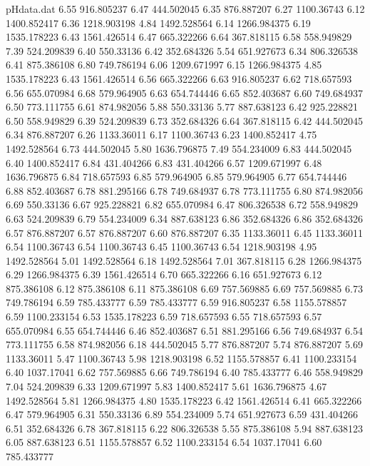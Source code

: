\begin{filecontents}{pHdata.dat}
6.55 	916.805237
6.47 	444.502045
6.35 	876.887207
6.27 	1100.36743
6.12 	1400.852417
6.36 	1218.903198
4.84 	1492.528564
6.14 	1266.984375
6.19 	1535.178223
6.43 	1561.426514
6.47 	665.322266
6.64 	367.818115
6.58 	558.949829
7.39 	524.209839
6.40 	550.33136
6.42 	352.684326
5.54 	651.927673
6.34 	806.326538
6.41 	875.386108
6.80 	749.786194
6.06 	1209.671997
6.15 	1266.984375
4.85 	1535.178223
6.43 	1561.426514
6.56 	665.322266
6.63 	916.805237
6.62 	718.657593
6.56 	655.070984
6.68 	579.964905
6.63 	654.744446
6.65 	852.403687
6.60 	749.684937
6.50 	773.111755
6.61 	874.982056
5.88 	550.33136
5.77 	887.638123
6.42 	925.228821
6.50 	558.949829
6.39 	524.209839
6.73 	352.684326
6.64 	367.818115
6.42 	444.502045
6.34 	876.887207
6.26 	1133.36011
6.17 	1100.36743
6.23 	1400.852417
4.75 	1492.528564
6.73 	444.502045
5.80 	1636.796875
7.49 	554.234009
6.83 	444.502045
6.40 	1400.852417
6.84 	431.404266
6.83 	431.404266
6.57 	1209.671997
6.48 	1636.796875
6.84 	718.657593
6.85 	579.964905
6.85 	579.964905
6.77 	654.744446
6.88 	852.403687
6.78 	881.295166
6.78 	749.684937
6.78 	773.111755
6.80 	874.982056
6.69 	550.33136
6.67 	925.228821
6.82 	655.070984
6.47 	806.326538
6.72 	558.949829
6.63 	524.209839
6.79 	554.234009
6.34 	887.638123
6.86 	352.684326
6.86 	352.684326
6.57 	876.887207
6.57 	876.887207
6.60 	876.887207
6.35 	1133.36011
6.45 	1133.36011
6.54 	1100.36743
6.54 	1100.36743
6.45 	1100.36743
6.54 	1218.903198
4.95 	1492.528564
5.01 	1492.528564
6.18 	1492.528564
7.01 	367.818115
6.28 	1266.984375
6.29 	1266.984375
6.39 	1561.426514
6.70 	665.322266
6.16 	651.927673
6.12 	875.386108
6.12 	875.386108
6.11 	875.386108
6.69 	757.569885
6.69 	757.569885
6.73 	749.786194
6.59 	785.433777
6.59 	785.433777
6.59 	916.805237
6.58 	1155.578857
6.59 	1100.233154
6.53 	1535.178223
6.59 	718.657593
6.55 	718.657593
6.57 	655.070984
6.55 	654.744446
6.46 	852.403687
6.51 	881.295166
6.56 	749.684937
6.54 	773.111755
6.58 	874.982056
6.18 	444.502045
5.77 	876.887207
5.74 	876.887207
5.69 	1133.36011
5.47 	1100.36743
5.98 	1218.903198
6.52 	1155.578857
6.41 	1100.233154
6.40 	1037.17041
6.62 	757.569885
6.66 	749.786194
6.40 	785.433777
6.46 	558.949829
7.04 	524.209839
6.33 	1209.671997
5.83 	1400.852417
5.61 	1636.796875
4.67 	1492.528564
5.81 	1266.984375
4.80 	1535.178223
6.42 	1561.426514
6.41 	665.322266
6.47 	579.964905
6.31 	550.33136
6.89 	554.234009
5.74 	651.927673
6.59 	431.404266
6.51 	352.684326
6.78 	367.818115
6.22 	806.326538
5.55 	875.386108
5.94 	887.638123
6.05 	887.638123
6.51 	1155.578857
6.52 	1100.233154
6.54 	1037.17041
6.60 	785.433777

\end{filecontents}
